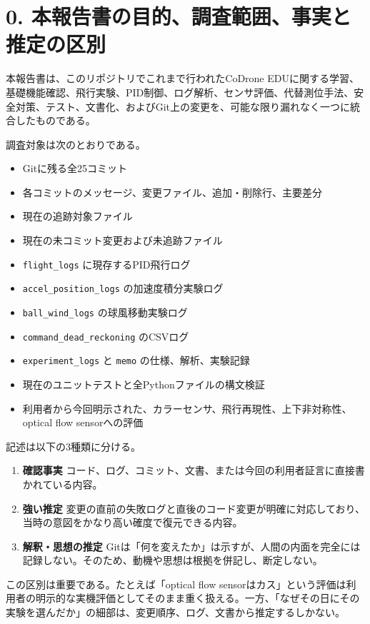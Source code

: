 \documentclass[10pt,a4paper,openany]{ltjsbook}
\begin{document}
\chapter{0. 本報告書の目的、調査範囲、事実と推定の区別}
本報告書は、このリポジトリでこれまで行われたCoDrone EDUに関する学習、基礎機能確認、飛行実験、PID制御、ログ解析、センサ評価、代替測位手法、安全対策、テスト、文書化、およびGit上の変更を、可能な限り漏れなく一つに統合したものである。\par
調査対象は次のとおりである。\par
\begin{itemize}
\item Gitに残る全25コミット
\item 各コミットのメッセージ、変更ファイル、追加・削除行、主要差分
\item 現在の追跡対象ファイル
\item 現在の未コミット変更および未追跡ファイル
\item \texttt{flight\_logs} に現存するPID飛行ログ
\item \texttt{accel\_position\_logs} の加速度積分実験ログ
\item \texttt{ball\_wind\_logs} の球風移動実験ログ
\item \texttt{command\_dead\_reckoning} のCSVログ
\item \texttt{experiment\_logs} と \texttt{memo} の仕様、解析、実験記録
\item 現在のユニットテストと全Pythonファイルの構文検証
\item 利用者から今回明示された、カラーセンサ、飛行再現性、上下非対称性、optical flow sensorへの評価
\end{itemize}
記述は以下の3種類に分ける。\par
\begin{enumerate}
\item \textbf{確認事実}  
コード、ログ、コミット、文書、または今回の利用者証言に直接書かれている内容。\par
\item \textbf{強い推定}  
変更の直前の失敗ログと直後のコード変更が明確に対応しており、当時の意図をかなり高い確度で復元できる内容。\par
\item \textbf{解釈・思想の推定}  
Gitは「何を変えたか」は示すが、人間の内面を完全には記録しない。そのため、動機や思想は根拠を併記し、断定しない。\par
\end{enumerate}
この区別は重要である。たとえば「optical flow sensorはカス」という評価は利用者の明示的な実機評価としてそのまま重く扱える。一方、「なぜその日にその実験を選んだか」の細部は、変更順序、ログ、文書から推定するしかない。\par
\vspace{0.3em}{\noindent\color{ReportLight}\rule{\linewidth}{0.8pt}}\vspace{0.3em}
\end{document}
